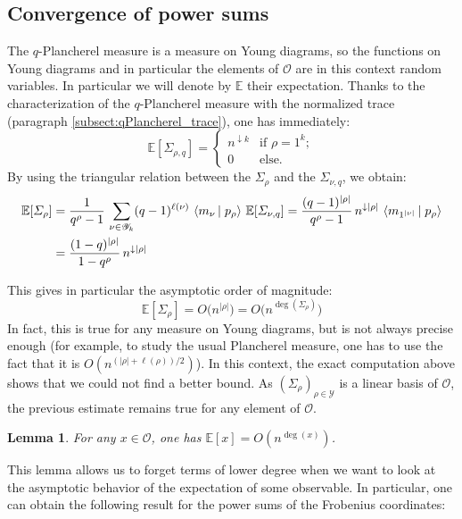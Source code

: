 \documentclass[10pt]{amsart}
\newtheorem{lemma}[theorem]{Lemma}
\theoremstyle{remark}
\newcommand{\young}{\mathscr{Y}}
\newcommand{\esper}{\mathbb{E}}
\newcommand{\obs}{\mathscr{O}}
\newcommand{\scal}[2]{\left\langle #1\vphantom{#2}\,\right |\left.#2 \vphantom{#1}\right\rangle}
\begin{document}
\subsection{Convergence of power sums}
The $q$-Plancherel measure is a measure on Young diagrams, so the functions on Young diagrams and in particular the elements of $\obs$ are in this context random variables. In particular we will denote by $\esper$ their expectation. Thanks to the characterization of the $q$-Plancherel measure with the normalized trace (paragraph \ref{subsect:qPlancherel_trace}), one has immediately:
$$\esper[\varSigma_{\rho,q}] = \begin{cases}
                                n^{\downarrow k} & \text{if }\rho = 1^k ;\\
				0 & \text{else.}
                               \end{cases}$$
By using the triangular relation between the $\varSigma_{\rho}$ and the $\varSigma_{\nu,q}$, we obtain:
\begin{align}\esper[\varSigma_{\rho}] &= \frac{1}{q^\rho-1}\,\sum_{\nu \in \young_k} (q-1)^{\ell(\nu)}\,\scal{m_\nu}{p_\rho}\,\esper[\varSigma_{\nu,q}]=\frac{(q-1)^{|\rho|}}{q^\rho-1}\,n^{\downarrow |\rho|}\,\scal{m_{1^{|\nu|}}}{p_\rho} \nonumber\\
\label{eq:esp_sigma} &=\frac{(1-q)^{|\rho|}}{1-q^\rho}\,n^{\downarrow|\rho|}
\end{align}\medskip

\noindent This gives in particular the asymptotic order of magnitude:
$$\esper[\varSigma_{\rho}] = O\big(n^{|\rho|}\big) = O\big(n^{\deg(\varSigma_{\rho})}\big)$$
In fact, this is true for any measure on Young diagrams, but is not always precise enough (for example, to study the usual Plancherel measure, one has to use the fact that it is $O(n^{(|\rho|+\ell(\rho))/2})$). In this context, the exact computation above shows that we could not find a better bound.
As $(\varSigma_{\rho})_{\rho \in \young}$ is a linear basis of $\obs$, the previous estimate remains true for any element of $\obs$.
\begin{lemma}\label{lem:major_Ex_deg}
 For any $x \in \obs$, one has
$\esper[x] = O(n^{\deg(x)})$.
\end{lemma}
\noindent This lemma allows us to forget terms of lower degree when we want to look at the asymptotic behavior of the expectation of some observable. In particular, one can obtain the following result for the power sums of the Frobenius coordinates:
\end{document}

